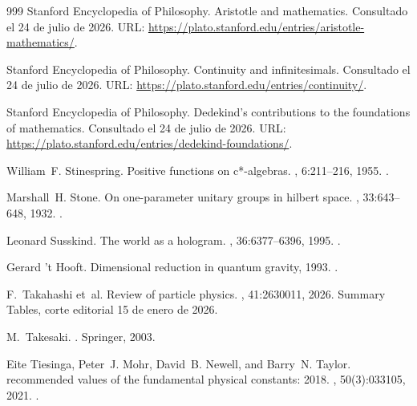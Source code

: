 \begin{thebibliography}{999}
{Stanford Encyclopedia of Philosophy}.
\newblock Aristotle and mathematics.
\newblock Consultado el 24 de julio de 2026.
\newblock URL: \url{https://plato.stanford.edu/entries/aristotle-mathematics/}.

{Stanford Encyclopedia of Philosophy}.
\newblock Continuity and infinitesimals.
\newblock Consultado el 24 de julio de 2026.
\newblock URL: \url{https://plato.stanford.edu/entries/continuity/}.

{Stanford Encyclopedia of Philosophy}.
\newblock Dedekind's contributions to the foundations of mathematics.
\newblock Consultado el 24 de julio de 2026.
\newblock URL: \url{https://plato.stanford.edu/entries/dedekind-foundations/}.

William~F. Stinespring.
\newblock Positive functions on c*-algebras.
, 6:211--216,
  1955.
\newblock \href {https://doi.org/10.1090/S0002-9939-1955-0069403-4}
  {}.

Marshall~H. Stone.
\newblock On one-parameter unitary groups in hilbert space.
, 33:643--648, 1932.
\newblock \href {https://doi.org/10.2307/1968538} {}.

Leonard Susskind.
\newblock The world as a hologram.
, 36:6377--6396, 1995.
\newblock \href {https://arxiv.org/abs/hep-th/9409089}
  {}.

Gerard {'t Hooft}.
\newblock Dimensional reduction in quantum gravity, 1993.
\newblock \href {https://arxiv.org/abs/gr-qc/9310026}
  {}.

F.~Takahashi et~al.
\newblock Review of particle physics.
, 41:2630011, 2026.
\newblock Summary Tables, corte editorial 15 de enero de 2026.

M.~Takesaki.
.
\newblock Springer, 2003.

Eite Tiesinga, Peter~J. Mohr, David~B. Newell, and Barry~N. Taylor.
 recommended values of the fundamental physical constants:
  2018.
, 50(3):033105,
  2021.
\newblock \href {https://doi.org/10.1063/5.0064853}
  {}.


\end{thebibliography}
